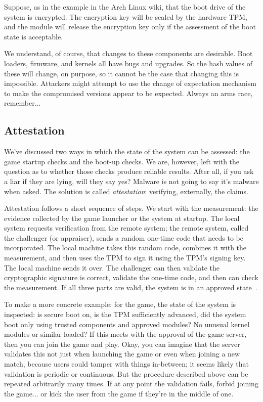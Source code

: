 Suppose, as in the example in the Arch Linux wiki, that the boot drive of the system is encrypted. The encryption key will be sealed by the hardware TPM, and the module will release the encryption key only if the assessment of the boot state is acceptable.

We understand, of course, that changes to these components are desirable. Boot loaders, firmware, and kernels all have bugs and upgrades. So the hash values of these will change, on purpose, so it cannot be the case that changing this is impossible. Attackers might attempt to use the change of expectation mechanism to make the compromised versions appear to be expected. Always an arms race, remember...

\subsection*{Attestation}
We've discussed two ways in which the state of the system can be assessed: the game startup checks and the boot-up checks. We are, however, left with the question as to whether those checks produce reliable results. After all, if you ask a liar if they are lying, will they say yes? Malware is not going to say it's malware when asked. The solution is called \textit{attestation}: verifying, externally, the claims.

Attestation follows a short sequence of steps. We start with the measurement: the evidence collected by the game launcher or the system at startup. The local system requests verification from the remote system; the remote system, called the challenger (or appraiser), sends a random one-time code that needs to be incorporated. The local machine takes this random code, combines it with the measurement, and then uses the TPM to sign it using the TPM's signing key. The local machine sends it over. The challenger can then validate the cryptographic signature is correct, validate the one-time code, and then can check the measurement. If all three parts are valid, the system is in an approved state~\cite{Coker2011}. 

To make a more concrete example: for the game, the state of the system is inspected: is secure boot on, is the TPM sufficiently advanced, did the system boot only using trusted components and approved modules? No unusual kernel modules or similar loaded? If this meets with the approval of the game server, then you can join the game and play. Okay, you can imagine that the server validates this not just when launching the game or even when joining a new match, because users could tamper with things in-between; it seems likely that validation is periodic or continuous. But the procedure described above can be repeated arbitrarily many times. If at any point the validation fails, forbid joining the game... or kick the user from the game if they're in the middle of one.


